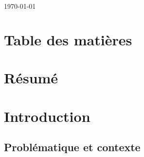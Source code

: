 \documentclass[11pt]{article}
\begin{document}
\begin{titlepage}
\vfill



{\large \today}\\[3cm] %



 

\end{titlepage}




\section*{Table des matières}

\renewcommand{\contentsname}{Table des matières}
\makeatletter
\renewcommand{\tableofcontents}{%
}
\makeatother
\tableofcontents
{}

\twocolumn
\section*{Résumé}

\section{Introduction} %
\label{sec:Introduction}

\subsection{Problématique et contexte} %
\label{sub:prob_contexte}
\end{document}
